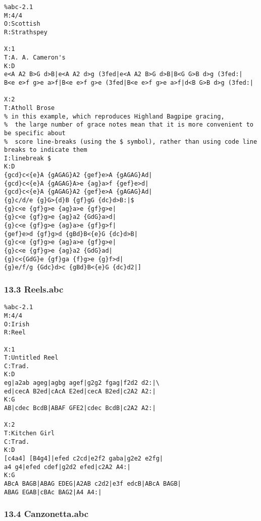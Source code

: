 \begin{verbatim}
%abc-2.1
M:4/4
O:Scottish
R:Strathspey

X:1
T:A. A. Cameron's
K:D
e<A A2 B>G d>B|e<A A2 d>g (3fed|e<A A2 B>G d>B|B<G G>B d>g (3fed:|
B<e e>f g>e a>f|B<e e>f g>e (3fed|B<e e>f g>e a>f|d<B G>B d>g (3fed:|

X:2
T:Atholl Brose
% in this example, which reproduces Highland Bagpipe gracing,
%  the large number of grace notes mean that it is more convenient to be specific about
%  score line-breaks (using the $ symbol), rather than using code line breaks to indicate them
I:linebreak $
K:D
{gcd}c<{e}A {gAGAG}A2 {gef}e>A {gAGAG}Ad|
{gcd}c<{e}A {gAGAG}A>e {ag}a>f {gef}e>d|
{gcd}c<{e}A {gAGAG}A2 {gef}e>A {gAGAG}Ad|
{g}c/d/e {g}G>{d}B {gf}gG {dc}d>B:|$
{g}c<e {gf}g>e {ag}a>e {gf}g>e|
{g}c<e {gf}g>e {ag}a2 {GdG}a>d|
{g}c<e {gf}g>e {ag}a>e {gf}g>f|
{gef}e>d {gf}g>d {gBd}B<{e}G {dc}d>B|
{g}c<e {gf}g>e {ag}a>e {gf}g>e|
{g}c<e {gf}g>e {ag}a2 {GdG}ad|
{g}c<{GdG}e {gf}ga {f}g>e {g}f>d|
{g}e/f/g {Gdc}d>c {gBd}B<{e}G {dc}d2|]
\end{verbatim}

\hypertarget{reelsabc}{\subsubsection{13.3 Reels.abc}\label{reelsabc}}

\begin{verbatim}
%abc-2.1
M:4/4
O:Irish
R:Reel

X:1
T:Untitled Reel
C:Trad.
K:D
eg|a2ab ageg|agbg agef|g2g2 fgag|f2d2 d2:|\
ed|cecA B2ed|cAcA E2ed|cecA B2ed|c2A2 A2:|
K:G
AB|cdec BcdB|ABAF GFE2|cdec BcdB|c2A2 A2:|

X:2
T:Kitchen Girl
C:Trad.
K:D
[c4a4] [B4g4]|efed c2cd|e2f2 gaba|g2e2 e2fg|
a4 g4|efed cdef|g2d2 efed|c2A2 A4:|
K:G
ABcA BAGB|ABAG EDEG|A2AB c2d2|e3f edcB|ABcA BAGB|
ABAG EGAB|cBAc BAG2|A4 A4:|
\end{verbatim}

\hypertarget{canzonettaabc}{\subsubsection{13.4
Canzonetta.abc}\label{canzonettaabc}}

